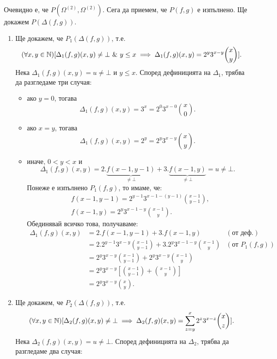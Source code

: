 \begin{solution}
  Очевидно е, че $P(\Omega^{(2)},\Omega^{(2)})$.
  Сега да приемем, че $P(f,g)$ е изпълнено. Ще докажем $P(\Delta(f,g))$.
  \begin{enumerate}[1)]
  \item 
    Ще докажем, че $P_1(\Delta(f,g))$, т.е.
    \[(\forall x,y\in\mathbb{N})[\Delta_1(f,g)(x,y) \neq \bot\ \&\ y\leq x \implies \Delta_1(f,g)(x,y) = 2^{y}3^{x-y}\binom{x}{y}].\]
    Нека $\Delta_1(f,g)(x,y) = u \neq \bot$ и $y \leq x$.
    Според дефиницията на $\Delta_1$, трябва да разгледаме три случая:
    \begin{itemize}
    \item 
      ако $y = 0$, тогава 
      \[\Delta_1(f,g)(x,y) = 3^x = 2^{0}3^{x-0}\binom{x}{0}.\]
    \item
      ако $x = y$, тогава
      \[\Delta_1(f,g)(x,y) = 2^y = 2^{y}3^{x-y}\binom{x}{y}.\]
    \item
      иначе, $0 < y < x$ и 
      \[\Delta_1(f,g)(x,y) = 2.\underbrace{f(x-1,y-1)}_{\neq \bot} + 3.\underbrace{f(x-1,y)}_{\neq \bot} = u \neq \bot.\]
      Понеже е изпълнено $P_1(f,g)$, то имаме, че:
      \begin{align*}
        & f(x-1,y-1) = 2^{y-1}3^{x-1-(y-1)}\binom{x-1}{y-1},\\
        & f(x-1,y) = 2^{y}3^{x-1-y}\binom{x-1}{y}.
      \end{align*}
      Обединявай всичко това, получаваме:
      \begin{align*}
        \Delta_1(f,g)(x,y) & = 2.f(x-1,y-1) + 3.f(x-1,y) & (\text{от деф.})\\
        & = 2.2^{y-1}3^{x-y}\binom{x-1}{y-1} + 3.2^{y}3^{x-1-y}\binom{x-1}{y} & (\text{от }P_1(f,g))\\
        & = 2^y3^{x-y}\binom{x-1}{y-1} + 2^y3^{x-y}\binom{x-1}{y}\\
        & = 2^y3^{x-y}[\binom{x-1}{y-1} + \binom{x-1}{y}]\\
        & = 2^y3^{x-y}\binom{x}{y}.
      \end{align*}
    \end{itemize}
    \item
      Ще докажем, че $P_2(\Delta(f,g))$, т.е.
      \[(\forall x,y\in\mathbb{N})[\Delta_2(f,g)(x,y) \neq \bot \implies \Delta_2(f,g)(x,y) = \sum^{x}_{z=y}2^{z}3^{x-z}\binom{x}{z}].\]
      Нека $\Delta_2(f,g)(x,y) = u \neq \bot$. Според дефиницията на $\Delta_2$, трябва да разгледаме два случая:

\end{enumerate}
\end{solution}
